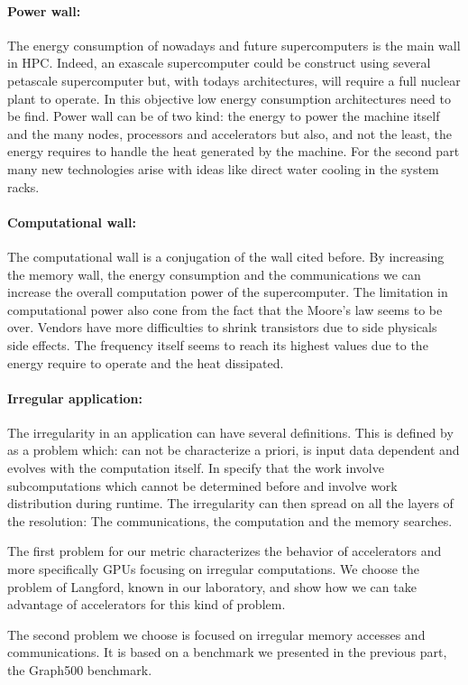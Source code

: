 \paragraph{Power wall: }
The energy consumption of nowadays and future supercomputers is the main wall in HPC. 
Indeed, an exascale supercomputer could be construct using several petascale supercomputer but, with todays architectures, will require a full nuclear plant to operate. 
In this objective low energy consumption architectures need to be find. 
Power wall can be of two kind: the energy to power the machine itself and the many nodes, processors and accelerators but also, and not the least, the energy requires to handle the heat generated by the machine. 
For the second part many new technologies arise with ideas like direct water cooling in the system racks.

\paragraph{Computational wall: }
The computational wall is a conjugation of the wall cited before. 
By increasing the memory wall, the energy consumption and the communications we can increase the overall computation power of the supercomputer. 
The limitation in computational power also cone from the fact that the Moore's law seems to be over. 
Vendors have more difficulties to shrink transistors due to side physicals side effects. 
The frequency itself seems to reach its highest values due to the energy require to operate and the heat dissipated. 

\paragraph{Irregular application: }
The irregularity in an application can have several definitions. 
This is defined by \cite{javairregular} as a problem which: can not be characterize a priori, is input data dependent and evolves with the computation itself. 
In \cite{suss2006implementing} specify that the work involve subcomputations which cannot be determined before and involve work distribution during runtime.
The irregularity can then spread on all the layers of the resolution:
The communications, the computation and the memory searches. 

The first problem for our metric characterizes the behavior of accelerators and more specifically GPUs focusing on irregular computations. 
We choose the problem of Langford, known in our laboratory, and show how we can take advantage of accelerators for this kind of problem. 

The second problem we choose is focused on irregular memory accesses and communications. 
It is based on a benchmark we presented in the previous part, the Graph500 benchmark.